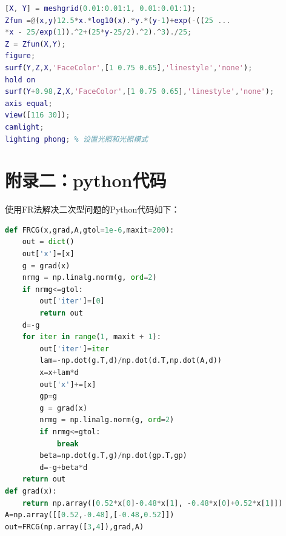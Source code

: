 \documentclass{zjgsureport}
\begin{document}
\begin{lstlisting}[language=matlab]
[X, Y] = meshgrid(0.01:0.01:1, 0.01:0.01:1); 
Zfun =@(x,y)12.5*x.*log10(x).*y.*(y-1)+exp(-((25 ... 
*x - 25/exp(1)).^2+(25*y-25/2).^2).^3)./25; 
Z = Zfun(X,Y); 
figure; 
surf(Y,Z,X,'FaceColor',[1 0.75 0.65],'linestyle','none'); 
hold on 
surf(Y+0.98,Z,X,'FaceColor',[1 0.75 0.65],'linestyle','none'); 
axis equal; 
view([116 30]); 
camlight; 
lighting phong; % 设置光照和光照模式
\end{lstlisting}

\section{附录二：python代码}\label{sub:FRCG}
使用FR法解决二次型问题的Python代码如下：
\begin{lstlisting}[language=python]
def FRCG(x,grad,A,gtol=1e-6,maxit=200):
    out = dict()
    out['x']=[x]
    g = grad(x)
    nrmg = np.linalg.norm(g, ord=2)
    if nrmg<=gtol:
        out['iter']=[0]
        return out
    d=-g
    for iter in range(1, maxit + 1):
        out['iter']=iter
        lam=-np.dot(g.T,d)/np.dot(d.T,np.dot(A,d))
        x=x+lam*d
        out['x']+=[x]
        gp=g
        g = grad(x)
        nrmg = np.linalg.norm(g, ord=2)
        if nrmg<=gtol:
            break
        beta=np.dot(g.T,g)/np.dot(gp.T,gp)
        d=-g+beta*d
    return out
def grad(x):
    return np.array([0.52*x[0]-0.48*x[1], -0.48*x[0]+0.52*x[1]])
A=np.array([[0.52,-0.48],[-0.48,0.52]])
out=FRCG(np.array([3,4]),grad,A)
\end{lstlisting}
\end{document}
